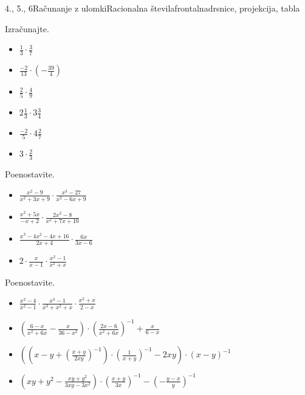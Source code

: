 \begin{priprava}{4., 5., 6}{}{Računanje z ulomki}{Racionalna števila}{frontalna}{drsnice, projekcija, tabla}
    \begin{naloga}
        Izračunajte.
        \begin{itemize}
                    \item $\frac{1}{3}\cdot \frac{3}{7}$ 
                    \item $\frac{-2}{13}\cdot \left(-\frac{39}{4}\right)$ 
                    \item $\frac{2}{5}\cdot \frac{4}{9}$ 
                    \item $2\frac{1}{3}\cdot 3\frac{3}{4}$ 
                    \item $\frac{-2}{5}\cdot 4\frac{2}{7}$ 
                    \item $3\cdot\frac{2}{3}$ 
        \end{itemize}
    \end{naloga}




    \begin{naloga}
        Poenostavite.
        \begin{itemize}
            \item $\frac{x^2-9}{x^2+3x+9}\cdot\frac{x^3-27}{x^2-6x+9}$ 
            \item $\frac{x^2+5x}{-x+2}\cdot\frac{2x^2-8}{x^2+7x+10}$ 
            \item $\frac{x^3-4x^2-4x+16}{2x+4}\cdot\frac{6x}{3x-6}$ 
            \item $2\cdot\frac{x}{x-1}\cdot\frac{x^2-1}{x^2+x}$ 
        \end{itemize}
    \end{naloga}




    \begin{naloga}
        Poenostavite.
        \begin{itemize}
            \item $\frac{x^2-4}{x^2-1}\cdot\frac{x^3-1}{x^3+x^2+x}\cdot\frac{x^2+x}{2-x}$ 
            \item $\left(\frac{6-x}{x^2+6x}-\frac{x}{36-x^2}\right)\cdot\left(\frac{2x-6}{x^2+6x}\right)^{-1}+\frac{x}{6-x}$ 
            \item $\left(\left(x-y+\left(\frac{x+y}{2xy}\right)^{-1}\right)\cdot\left(\frac{1}{x+y}\right)^{-1}-2xy\right)\cdot(x-y)^{-1}$ 
            \item $\left(xy+y^2-\frac{xy+y^2}{3xy-3x^2}\right)\cdot\left(\frac{x+y}{3x}\right)^{-1}-\left(-\frac{y-x}{y}\right)^{-1}$ 
        \end{itemize}
    \end{naloga}




\end{priprava}

